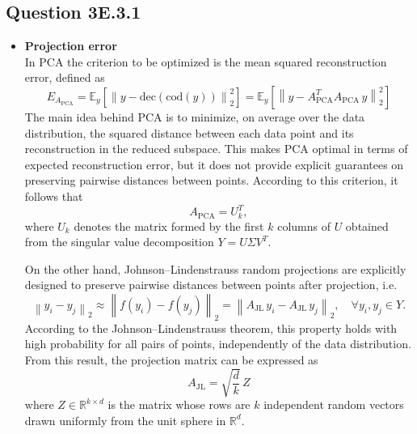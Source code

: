 \documentclass[a4paper]{scrartcl}
\begin{document}
\subsection*{Question 3E.3.1}
\begin{itemize}
    \item \textbf{Projection error}
\\
In PCA the criterion to be optimized is the mean squared reconstruction error, defined as
\begin{equation*}
E_{A_\text{PCA}}=
\mathbb{E}_{y}\left[
\left\lVert
y-\mathrm{dec}\!\left(\mathrm{cod}\!\left(y\right)\right)
\right\rVert_2^2
\right]
=
\mathbb{E}_{y}\left[
\left\lVert
y-A_{\text{PCA}}^T A_{\text{PCA}}\,y
\right\rVert_2^2
\right]
\end{equation*}
The main idea behind PCA is to minimize, on average over the data distribution, the squared distance between each data point and its reconstruction in the reduced subspace. This makes PCA optimal in terms of expected reconstruction error, but it does not provide explicit guarantees on preserving pairwise distances between points. According to this criterion, it follows that
\begin{equation}
    A_{\text{PCA}} = U_k^T,
\end{equation}
where $U_k$ denotes the matrix formed by the first $k$ columns of $U$ obtained from the singular value decomposition $Y = U \Sigma V^T$.


On the other hand, Johnson--Lindenstrauss random projections are explicitly designed to preserve pairwise distances between points after projection, i.e.
\begin{equation*}
    \left\lVert y_i - y_j \right\rVert_2
    \approx
    \left\lVert
        f\!\left( y_i \right) - f\!\left( y_j \right)
    \right\rVert_2
    =
    \left\lVert
        A_{\text{JL}} \, y_i - A_{\text{JL}} \, y_j
    \right\rVert_2,
    \quad
    \forall y_i, y_j \in Y.
\end{equation*}
According to the Johnson--Lindenstrauss theorem, this property holds with high probability for all pairs of points, independently of the data distribution. From this result, the projection matrix can be expressed as
\begin{equation}
    A_{\text{JL}} = \sqrt{\dfrac{d}{k}} \, Z
\end{equation}
where $Z \in \mathbb{R}^{k \times d}$ is the matrix whose rows are $k$ independent random vectors drawn uniformly from the unit sphere in $\mathbb{R}^d$.


\end{itemize}
\end{document}
